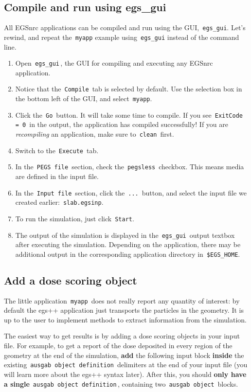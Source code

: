 \documentclass[12pt,twoside]{article}
\begin{document}
\clearpage
\subsection{Compile and run using egs\_gui}
All EGSnrc applications can be compiled and run using the GUI, \,\Verb|egs_gui|.
Let's rewind, and repeat the \,\Verb|myapp| example using \,\Verb|egs_gui|
instead of the command line.

\begin{enumerate}
\item Open \,\Verb|egs_gui|\,, the GUI for compiling and executing any EGSnrc application.
\item Notice that the \,\Verb|Compile|\, tab is selected by default. Use the selection box in the bottom left of the GUI, and select \,\Verb|myapp|.
\item Click the \,\Verb|Go|\, button. It will take some time to compile. If you see \,\Verb|ExitCode = 0|\, in the output, the application has compiled successfully! If you are \textit{recompiling} an application, make sure to \,\Verb|clean|\, first.
\item Switch to the \,\Verb|Execute|\, tab.
\item In the \,\Verb|PEGS file|\, section, check the \,\Verb|pegsless|\, checkbox. This means media are defined in the input file.
\item In the \,\Verb|Input file|\, section, click the \,\Verb|...|\, button, and
select the input file we created earlier: \,\Verb|slab.egsinp|.
\item To run the simulation, just click \,\Verb|Start|.
\item The output of the simulation is displayed in the \,\Verb|egs_gui|\, output
textbox after executing the simulation. Depending on the application, there
may be additional output in the corresponding application directory in
\,\Verb|$EGS_HOME|.
\end{enumerate}

\subsection{Add a dose scoring object}

The little application \,\Verb|myapp|\, does not really report any quantity
of interest: by default the egs++ application just transports the
particles in the geometry. It is up to the user to implement methods to
extract information from the simulation.

The easiest way to get results is by adding a dose scoring objects in
your input file. For example, to get a report of the dose deposited in
every region of the geometry at the end of the simulation, \textbf{add}
the following input block \textbf{inside} the existing
\,\Verb|ausgab object definition|\, delimiters at the end of your input
file (you will learn more about the egs++ syntax later). After this, you should
\textbf{only have a single} \,\Verb|ausgab object definition|\,, containing two
\,\Verb|ausgab object|\, blocks.
\end{document}
